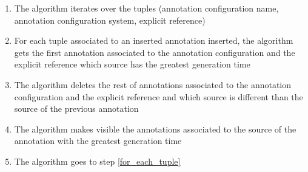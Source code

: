 \begin{enumerate}

\item The algorithm iterates over the tuples (annotation configuration name, annotation configuration system, explicit reference)
\item \label{for_each_tuple} For each tuple associated to an inserted annotation inserted, the algorithm gets the first annotation associated to the annotation configuration and the explicit reference which source has the greatest generation time
\item The algorithm deletes the rest of annotations associated to the annotation configuration and the explicit reference and which source is different than the source of the previous annotation
\item The algorithm makes visible the annotations associated to the source of the annotation with the greatest generation time
\item The algorithm goes to step \ref{for_each_tuple}
\end{enumerate}


